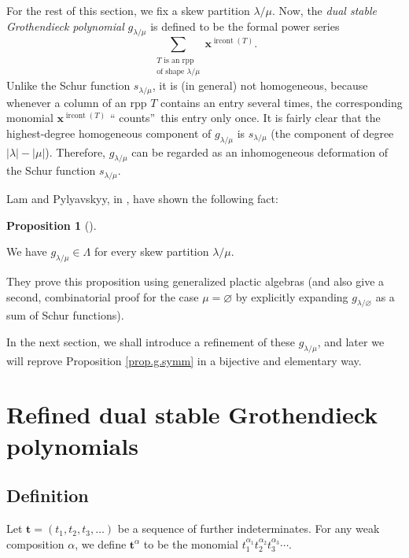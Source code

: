 \documentclass[numbers=enddot,12pt,final,onecolumn,notitlepage]{scrartcl}%
\theoremstyle{definition}
\newtheorem{prop}[theo]{Proposition}
\newenvironment{proposition}[1][]
{\begin{prop}[#1]\begin{leftbar}}
{\end{leftbar}\end{prop}}
\let\sumnonlimits\sum
\renewcommand{\sum}{\sumnonlimits\limits}
\def\t{{\mathbf{t}}}
\def\lm{{\lambda/\mu}}
\begin{document}
For the rest of this section, we fix a skew partition $\lambda/\mu$. Now, the
\textit{dual stable Grothendieck polynomial} $g_{\lambda/\mu}$ is defined to
be the formal power series%
\[
\sum_{\substack{T\text{ is an rpp}\\\text{of shape }\lm}}\mathbf{x}^{\operatorname*{ircont}\left(  T\right)  }.
\]
Unlike the Schur function $s_{\lambda/\mu}$, it is (in
general) not homogeneous, because whenever a column of an rpp $T$ contains an
entry several times, the corresponding monomial $\mathbf{x}%
^{\operatorname*{ircont}\left(  T\right)  }$ \textquotedblleft
counts\textquotedblright\ this entry only once. It is fairly clear that the
highest-degree homogeneous component of $g_{\lambda/\mu}$ is $s_{\lambda/\mu}$
(the component of degree $\left\vert \lambda\right\vert -\left\vert
\mu\right\vert $). Therefore, $g_{\lambda/\mu}$ can be regarded as an
inhomogeneous deformation of the Schur function $s_{\lambda/\mu}$.

Lam and Pylyavskyy, in \cite[\S 9.1]{LamPyl}, have shown the following fact:

\begin{proposition}
\label{prop.g.symm}We have $g_{\lambda/\mu}\in\Lambda$ for every skew
partition $\lambda/\mu$.
\end{proposition}


They prove this proposition using generalized plactic algebras \cite[Lemma
3.1]{FomGre} (and also give a second, combinatorial proof for the case
$\mu=\varnothing$ by explicitly expanding $g_{\lambda/\varnothing}$ as a sum
of Schur functions).


In the next section, we shall introduce a refinement of these $g_{\lambda/\mu
}$, and later we will reprove Proposition \ref{prop.g.symm} in a
bijective 
and elementary way.

\section{\label{sect.def}Refined dual stable Grothendieck polynomials}

\subsection{Definition}

 Let $\t=\left(t_{1},t_{2},t_{3},\ldots\right)$ be a sequence of further indeterminates. For any weak composition $\alpha$, we define $\t^\alpha$ to be the monomial $t_1^{\alpha_1} t_2^{\alpha_2} t_3^{\alpha_3} \cdots$.
\end{document}
